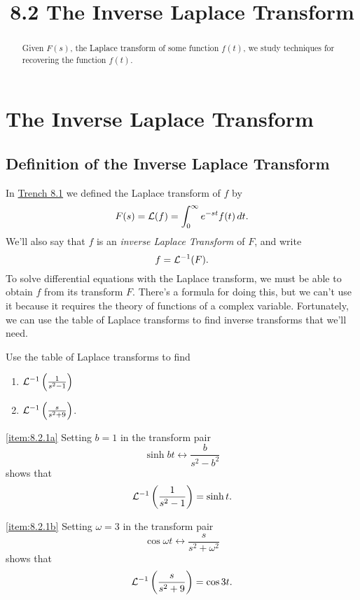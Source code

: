 \documentclass{ximera}
\title{8.2 The Inverse Laplace Transform}%
\begin{document}
\begin{abstract}
Given $F(s)$, the Laplace transform of some function $f(t)$, we study techniques for recovering the function $f(t)$.
\end{abstract}

\maketitle

\section*{The Inverse Laplace Transform}

\subsection*{Definition of the Inverse Laplace Transform}

In \href{https://ximera.osu.edu/ode/main/introToLaplace/introToLaplace}{Trench 8.1} we defined the Laplace transform
of
$f$ by
$$
F(s)={\cal L}(f)=\int_0^\infty e^{-st}f(t)\,dt.
$$
We'll also say that $f$ is an \textit{inverse Laplace Transform} of
$F$, and write
$$
f={\cal L}^{-1}(F).
$$
To solve differential equations with the Laplace transform, we
must be able to obtain $f$ from its transform $F$. There's a formula
for doing this, but we can't use it because it requires the theory of
functions of a complex variable. Fortunately, we can use the table of
Laplace transforms to find inverse transforms that we'll need.

\begin{example}\label{example:8.2.1}
Use the table of Laplace transforms to find
\begin{enumerate}
    
    \item\label{item:8.2.1a} ${\cal L}^{-1}\left(\frac{1}{s^2-1}\right)$
    \item\label{item:8.2.1b} ${\cal L}^{-1}\left(\frac{s}{s^2+9}\right)$. 
\end{enumerate}
\begin{explanation}
\ref{item:8.2.1a}
Setting $b=1$ in  the transform pair
$$
\sinh bt\leftrightarrow \frac{b}{s^2-b^2}
$$
shows that
$$
{\cal L}^{-1}\left(\frac{1}{s^2-1}\right)=\sinh t.
$$

\ref{item:8.2.1b}
Setting $\omega=3$ in  the transform pair
$$
\cos\omega t\leftrightarrow\frac{s}{s^2+\omega^2}
$$
shows that
$$
{\cal L}^{-1}\left(\frac{s}{s^2+9}\right)=\cos3t.
$$
\end{explanation}
\end{example}
\end{document}
